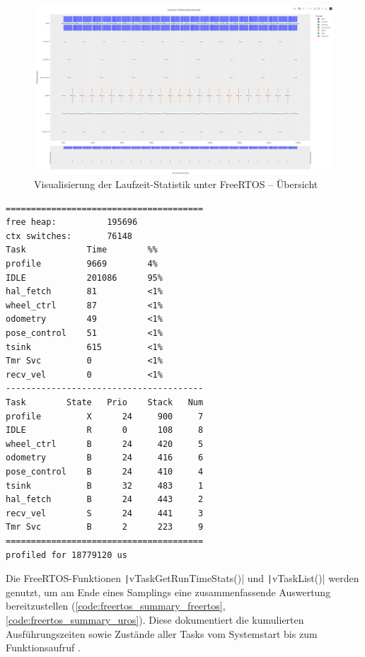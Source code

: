 \begin{figure}[h]
    \centering
    \includegraphics[width=1\textwidth]{assets/freertos_profiling}
    \caption{Visualisierung der Laufzeit-Statistik unter FreeRTOS -- Übersicht}
    \label{fig:freertos_profiling}
\end{figure}

\begin{code}
\begin{verbatim}
=======================================
free heap:          195696
ctx switches:       76148
Task            Time        %%
profile         9669        4%
IDLE            201086      95%
hal_fetch       81          <1%
wheel_ctrl      87          <1%
odometry        49          <1%
pose_control    51          <1%
tsink           615         <1%
Tmr Svc         0           <1%
recv_vel        0           <1%
---------------------------------------
Task        State   Prio    Stack   Num
profile         X      24     900     7
IDLE            R      0      108     8
wheel_ctrl      B      24     420     5
odometry        B      24     416     6
pose_control    B      24     410     4
tsink           B      32     483     1
hal_fetch       B      24     443     2
recv_vel        S      24     441     3
Tmr Svc         B      2      223     9
=======================================
profiled for 18779120 us
\end{verbatim}
    \label{code:freertos_summary_freertos}
\end{code}

Die FreeRTOS-Funktionen \texttt|vTaskGetRunTimeStats()| und
\texttt|vTaskList()| werden genutzt, um am Ende eines Samplings eine
zusammenfassende Auswertung bereitzustellen
(\ref{code:freertos_summary_freertos}, \ref{code:freertos_summary_uros}). Diese
dokumentiert die kumulierten Ausführungszeiten sowie Zustände aller Tasks vom
Systemstart bis zum Funktionsaufruf \cite{freertos_runtime_stats}.

